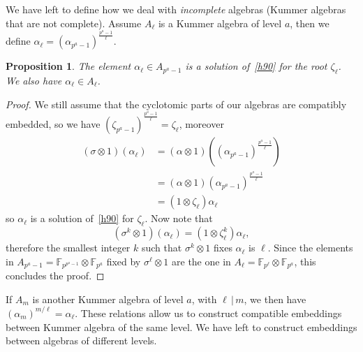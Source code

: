 \documentclass{sig-alternate}
\newtheorem{proposition}{Proposition}
\begin{document}
We have left to define how we deal with \emph{incomplete} algebras (Kummer
algebras that are not complete). Assume $A_\ell$ is a Kummer algebra of level
$a$, then we define $\alpha_\ell = (\alpha_{p^a-1})^{\frac{p^a-1}{\ell}}$.
\begin{proposition}
  The element $\alpha_\ell\in A_{p^a-1}$ is a solution of~\eqref{h90} for the
  root $\zeta_\ell$. We also have $\alpha_\ell\in A_\ell$.
\end{proposition}
\begin{proof}
We still assume that the cyclotomic parts of our algebras are compatibly
embedded, so we have $(\zeta_{p^a-1})^{\frac{p^a-1}{\ell}} = \zeta_\ell$,
moreover
\begin{align*}
  (\sigma\otimes1)(\alpha_\ell) &=
  (\alpha\otimes1)((\alpha_{p^a-1})^{\frac{p^a-1}{\ell}}) \\
  &= (\alpha\otimes1)(\alpha_{p^a-1})^{\frac{p^a-1}{\ell}} \\
  &= (1\otimes\zeta_\ell)\alpha_\ell
\end{align*}
so $\alpha_\ell$ is a solution of~\eqref{h90} for $\zeta_\ell$. Now note that 
\[
  (\sigma^k\otimes1)(\alpha_\ell) = (1\otimes\zeta_\ell^k)\alpha_\ell,
\]
therefore the smallest integer $k$ such that $\sigma^k\otimes1$ fixes
$\alpha_\ell$ is $\ell$. Since the elements in
$A_{p^a-1}=\mathbb{F}_{p^{p^a-1}}\otimes\mathbb{F}_{p^a}$ fixed by
$\sigma^\ell\otimes1$ are the one in
$A_\ell = \mathbb{F}_{p^\ell}\otimes\mathbb{F}_{p^a}$, this concludes the
proof.
\end{proof}
If $A_m$ is another Kummer algebra of level $a$, with $\ell\,|\,m$, we then have
$(\alpha_m)^{m/\ell} = \alpha_\ell$. These relations allow us to construct
compatible embeddings between Kummer algebra of the same level. We have left to
construct embeddings between algebras of different levels.
\end{document}
